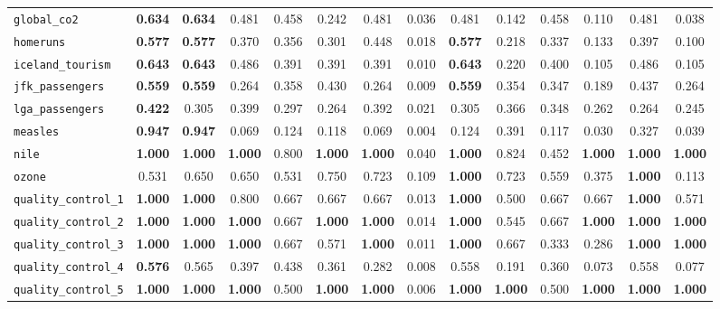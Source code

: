 \begin{tabular}{lccccccccccccc}
\verb+global_co2+ & \textbf{0.634} & \textbf{0.634} & 0.481 & 0.458 & 0.242 & 0.481 & 0.036 & 0.481 & 0.142 & 0.458 & 0.110 & 0.481 & 0.038\\
\verb+homeruns+ & \textbf{0.577} & \textbf{0.577} & 0.370 & 0.356 & 0.301 & 0.448 & 0.018 & \textbf{0.577} & 0.218 & 0.337 & 0.133 & 0.397 & 0.100\\
\verb+iceland_tourism+ & \textbf{0.643} & \textbf{0.643} & 0.486 & 0.391 & 0.391 & 0.391 & 0.010 & \textbf{0.643} & 0.220 & 0.400 & 0.105 & 0.486 & 0.105\\
\verb+jfk_passengers+ & \textbf{0.559} & \textbf{0.559} & 0.264 & 0.358 & 0.430 & 0.264 & 0.009 & \textbf{0.559} & 0.354 & 0.347 & 0.189 & 0.437 & 0.264\\
\verb+lga_passengers+ & \textbf{0.422} & 0.305 & 0.399 & 0.297 & 0.264 & 0.392 & 0.021 & 0.305 & 0.366 & 0.348 & 0.262 & 0.264 & 0.245\\
\verb+measles+ & \textbf{0.947} & \textbf{0.947} & 0.069 & 0.124 & 0.118 & 0.069 & 0.004 & 0.124 & 0.391 & 0.117 & 0.030 & 0.327 & 0.039\\
\verb+nile+ & \textbf{1.000} & \textbf{1.000} & \textbf{1.000} & 0.800 & \textbf{1.000} & \textbf{1.000} & 0.040 & \textbf{1.000} & 0.824 & 0.452 & \textbf{1.000} & \textbf{1.000} & \textbf{1.000}\\
\verb+ozone+ & 0.531 & 0.650 & 0.650 & 0.531 & 0.750 & 0.723 & 0.109 & \textbf{1.000} & 0.723 & 0.559 & 0.375 & \textbf{1.000} & 0.113\\
\verb+quality_control_1+ & \textbf{1.000} & \textbf{1.000} & 0.800 & 0.667 & 0.667 & 0.667 & 0.013 & \textbf{1.000} & 0.500 & 0.667 & 0.667 & \textbf{1.000} & 0.571\\
\verb+quality_control_2+ & \textbf{1.000} & \textbf{1.000} & \textbf{1.000} & 0.667 & \textbf{1.000} & \textbf{1.000} & 0.014 & \textbf{1.000} & 0.545 & 0.667 & \textbf{1.000} & \textbf{1.000} & \textbf{1.000}\\
\verb+quality_control_3+ & \textbf{1.000} & \textbf{1.000} & \textbf{1.000} & 0.667 & 0.571 & \textbf{1.000} & 0.011 & \textbf{1.000} & 0.667 & 0.333 & 0.286 & \textbf{1.000} & \textbf{1.000}\\
\verb+quality_control_4+ & \textbf{0.576} & 0.565 & 0.397 & 0.438 & 0.361 & 0.282 & 0.008 & 0.558 & 0.191 & 0.360 & 0.073 & 0.558 & 0.077\\
\verb+quality_control_5+ & \textbf{1.000} & \textbf{1.000} & \textbf{1.000} & 0.500 & \textbf{1.000} & \textbf{1.000} & 0.006 & \textbf{1.000} & \textbf{1.000} & 0.500 & \textbf{1.000} & \textbf{1.000} & \textbf{1.000}\\

\end{tabular}
